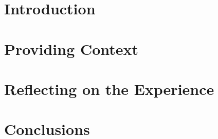 \documentclass[11pt, a4paper, twoside, openright]{report}
\begin{document}
\mainmatter


\section{Introduction}



\section{Providing Context}

\section{Reflecting on the Experience}

\section{Conclusions}
\end{document}
